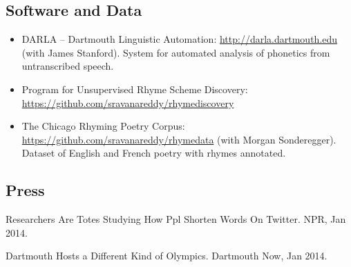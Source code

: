 \documentclass[10.5pt,letterpaper]{article}
\begin{document}
\subsection*{Software and Data}

\begin{itemize}
\item DARLA -- Dartmouth Linguistic Automation: \url{http://darla.dartmouth.edu} (with James Stanford). System for automated analysis of phonetics from untranscribed speech.


\item Program for Unsupervised Rhyme Scheme Discovery: \url{https://github.com/sravanareddy/rhymediscovery}

\item The Chicago Rhyming Poetry Corpus: \url{https://github.com/sravanareddy/rhymedata} (with Morgan Sonderegger). Dataset of English and French poetry with rhymes annotated.
\end{itemize}



\subsection*{Press}
\begin{itemize*}
\item Researchers Are Totes Studying How Ppl Shorten Words On Twitter. NPR, Jan 2014.

\item Dartmouth Hosts a Different Kind of Olympics. Dartmouth Now, Jan 2014.
\end{itemize*}

%
%
%
\end{document}
